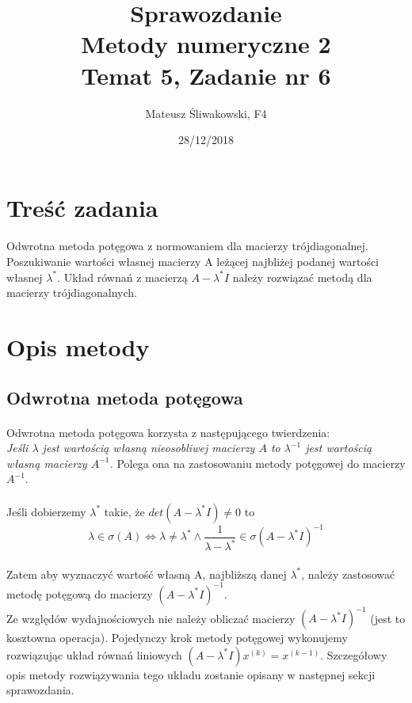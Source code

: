 \documentclass{article}
\title{Sprawozdanie \\Metody numeryczne 2 \\\textbf{Temat 5, Zadanie nr 6}}
\date{28/12/2018}
\author{Mateusz Śliwakowski, F4}
\begin{document}
  \maketitle
 	  \newpage

\section{Treść zadania}
\paragraph{}
Odwrotna metoda potęgowa z normowaniem dla macierzy trójdiagonalnej. Poszukiwanie wartości własnej macierzy A leżącej najbliżej podanej wartości własnej $\lambda^*$. Układ równań z macierzą $A - \lambda^*I$ należy rozwiązać metodą dla macierzy trójdiagonalnych.
\section{Opis metody}
\subsection{Odwrotna metoda potęgowa}
\paragraph{}
Odwrotna metoda potęgowa korzysta z następującego twierdzenia:\\
\textit{Jeśli $\lambda$ jest wartością własną nieosobliwej macierzy $A$ to $\lambda^{-1}$ jest wartością własną macierzy $A^{-1}$.}
Polega ona na zastosowaniu metody potęgowej do macierzy $A^{-1}$.
\paragraph{}
Jeśli dobierzemy $\lambda^*$ takie, że $det(A-\lambda^{*}I)\neq0$ to $$\lambda \in \sigma(A) \Leftrightarrow \lambda \neq \lambda^{*} \wedge \frac{1}{\lambda-\lambda^{*}} \in \sigma(A-\lambda^* I)^{-1}$$ 
\paragraph{}
Zatem aby wyznaczyć wartość własną A, najbliższą danej $\lambda^*$, należy zastosować metodę potęgową do macierzy $(A-\lambda^*I)^{-1}$.\\
Ze względów wydajnościowych nie należy obliczać macierzy $(A-\lambda^*I)^{-1}$ (jest to kosztowna operacja). Pojedynczy krok metody potęgowej wykonujemy rozwiązując układ równań liniowych $(A - \lambda^*I)x^{(k)} = x^{(k-1)}$. Szczegółowy opis metody rozwiązywania tego układu zostanie opisany w następnej sekcji sprawozdania.
\end{document}
